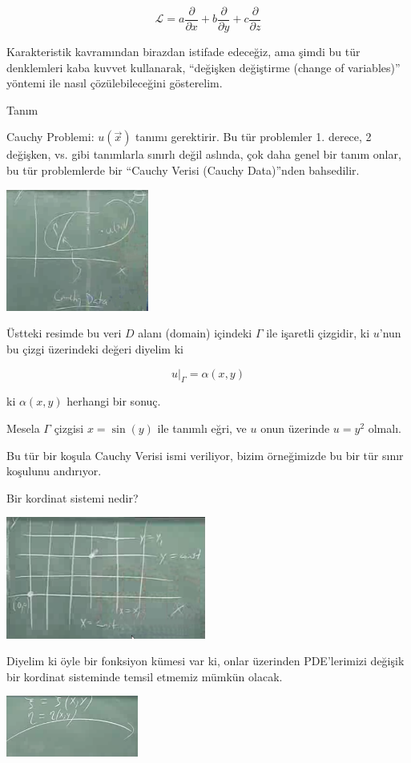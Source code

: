 \documentclass[12pt,fleqn]{article}\usepackage{../../common}
\begin{document}
$$ \mathcal{L} = a \frac{\partial }{\partial x} +
b \frac{\partial }{\partial y} +
c \frac{\partial }{\partial z} 
$$

Karakteristik kavramından birazdan istifade edeceğiz, ama şimdi bu tür
denklemleri kaba kuvvet kullanarak, ``değişken değiştirme (change of
variables)'' yöntemi ile nasıl çözülebileceğini gösterelim. 

Tanım

Cauchy Problemi: $u(\vec{x})$ tanımı gerektirir. Bu tür problemler
1. derece, 2 değişken, vs. gibi tanımlarla sınırlı değil aslında, çok daha
genel bir tanım onlar, bu tür problemlerde bir ``Cauchy Verisi (Cauchy
Data)''nden bahsedilir.

\includegraphics[height=4cm]{1_11.png}

Üstteki resimde bu veri $D$ alanı (domain) içindeki $\Gamma$ ile işaretli
çizgidir, ki $u$'nun bu çizgi üzerindeki değeri diyelim ki

$$ u|_{\Gamma} = \alpha(x,y) $$

ki $\alpha(x,y)$ herhangi bir sonuç. 

Mesela $\Gamma$ çizgisi $x=\sin(y)$ ile tanımlı eğri, ve $u$ onun üzerinde
$u=y^2$ olmalı.

Bu tür bir koşula Cauchy Verisi ismi veriliyor, bizim örneğimizde bu bir
tür sınır koşulunu andırıyor.

Bir kordinat sistemi nedir? 

\includegraphics[height=4cm]{1_12.png}

Diyelim ki öyle bir fonksiyon kümesi var ki, onlar üzerinden PDE'lerimizi
değişik bir kordinat sisteminde temsil etmemiz mümkün olacak. 

\includegraphics[height=2cm]{1_13.png}
\end{document}
